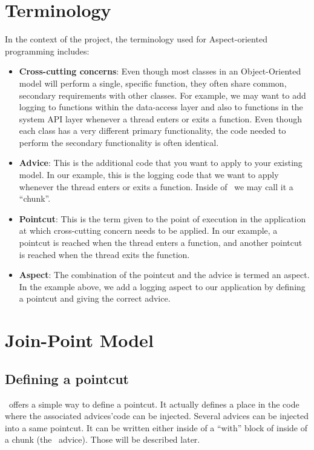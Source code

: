 \documentclass[american]{rtxreport}
\begin{document}
\section{Terminology}
In the context of the project, the terminology used for Aspect-oriented
programming includes:

\begin{itemize}
    \item \textbf{Cross-cutting concerns}: Even though most classes in an
        Object-Oriented model will perform a single, specific function, they
        often share common, secondary requirements with other classes. For
        example, we may want to add logging to functions within the data-access
        layer and also to functions in the system API layer whenever a thread
        enters or exits a function. Even though each class has a very different
        primary functionality, the code needed to perform the secondary
        functionality is often identical.
    \item \textbf{Advice}: This is the additional code that you want to apply
        to your existing model. In our example, this is the logging code that
        we want to apply whenever the thread enters or exits a function. Inside
        of \rtx\ we may call it a ``chunk''.
    \item \textbf{Pointcut}: This is the term given to the point of execution
        in the application at which cross-cutting concern needs to be applied.
        In our example, a pointcut is reached when the thread enters a
        function, and another pointcut is reached when the thread exits the
        function.
    \item \textbf{Aspect}: The combination of the pointcut and the advice is
        termed an aspect. In the example above, we add a logging aspect to our
        application by defining a pointcut and giving the correct advice.
\end{itemize}

\section{Join-Point Model}

\subsection{Defining a pointcut}

\rtx\ offers a simple way to define a pointcut. It actually defines a place in
the code where the associated advices'code can be injected. Several advices can
be injected into a same pointcut. It can be written either inside of a ``with''
block of inside of a chunk (the \rtx\ advice).  Those will be described later.
\end{document}
